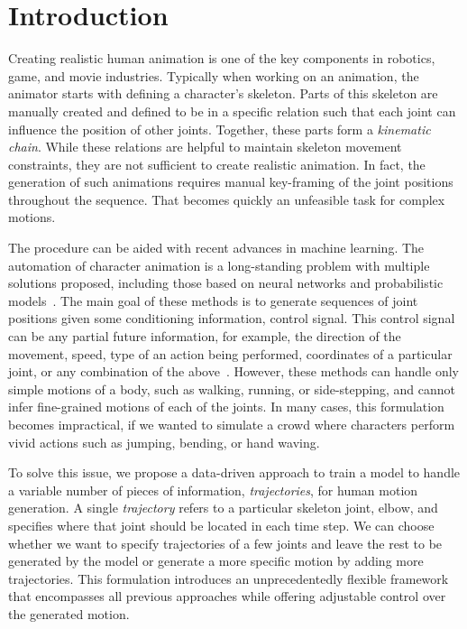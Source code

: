 \documentclass[10pt,twocolumn,letterpaper]{article}
\begin{document}
\section{Introduction}
Creating realistic human animation is one of the key components in
robotics, game, and movie industries. Typically when working on an animation, 
the animator 
starts with defining a character's skeleton. Parts of this skeleton are manually created and defined to be in a specific relation such that each joint can influence the position of other joints. Together, these parts form a \textit{kinematic chain}. While these relations are helpful to maintain skeleton movement constraints, they are not sufficient to create realistic animation.  In fact, the generation of such animations requires manual key-framing of the joint positions throughout the sequence. That becomes quickly an unfeasible task for complex motions. 

The procedure can be aided with recent advances in machine learning. The automation of character animation is a long-standing problem with multiple solutions proposed, including those based on neural networks and probabilistic models~\cite{rose1998verbs,rose2001artist, taylor2007modeling,fragkiadaki2015recurrent,holden2015learning,holden2016deep}. The main goal of these methods is to generate sequences of joint positions given some conditioning information, \ie control signal. 
This control signal can be any partial future information, for example, the direction of the movement, speed, type of an action being performed, coordinates of a particular joint, or any combination of the above~\cite{henter2020moglow, pavllo2019modeling,chen2020dynamic, ghorbani2020probabilistic, holden2017phase, zhang2018mode, wang2019combining}. However, these methods can handle only simple motions of a body, such as walking, running, or side-stepping, and cannot infer fine-grained motions of each of the joints. In many cases, this formulation becomes impractical, if we wanted to simulate a crowd where characters perform vivid actions such as jumping, bending, or hand waving.%

To solve this issue, we propose a data-driven approach to train a model to handle a variable number of pieces of information, \textit{trajectories}, for human motion generation. A single \textit{trajectory} refers to a particular skeleton joint, \eg elbow, and specifies where that joint should be located in each time step. We can choose whether we want to specify trajectories of a few joints and leave the rest to be generated by the model or generate a more specific motion by adding more trajectories. This formulation introduces an unprecedentedly flexible framework that encompasses all previous approaches while offering adjustable control over the generated motion.
\end{document}
